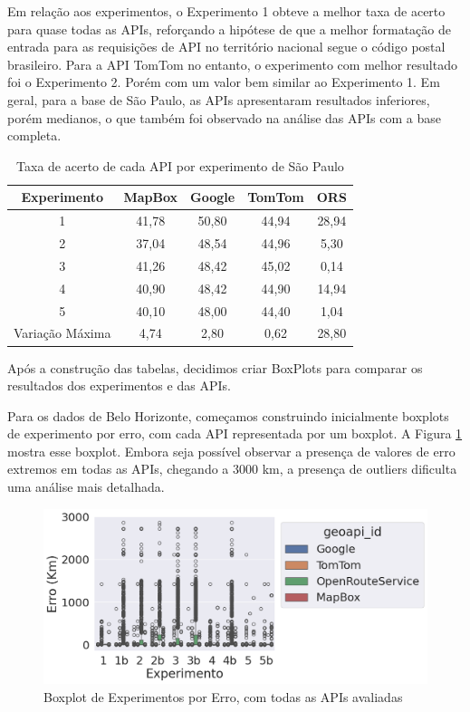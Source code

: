 Em relação aos experimentos, o Experimento 1 obteve a melhor taxa de acerto para quase todas as APIs, reforçando a hipótese de que a melhor formatação de entrada para as requisições de API no território nacional segue o código postal brasileiro. Para a API TomTom no entanto, o experimento com melhor resultado foi o Experimento 2. Porém com um valor bem similar ao Experimento 1. Em geral, para a base de São Paulo, as APIs apresentaram resultados inferiores, porém medianos, o que também foi observado na análise das APIs com a base completa.

\begin{table}[!ht]
  \centering
  \caption{Taxa de acerto de cada API por experimento de São Paulo}
  \label{tab:txAcerExpAPISP}
  \begin{adjustbox}{width=0.7\textwidth}
  \begin{tabular}{|c|c|c|c|c|}
  \hline
  Experimento & MapBox & Google & TomTom & ORS\\
  \hline
  1 & 41,78 & 50,80 & 44,94 & 28,94\\
  \hline
  2 & 37,04 & 48,54 & 44,96 & 5,30\\
  \hline
  3 & 41,26 & 48,42 & 45,02 & 0,14\\
  \hline
  4 & 40,90 & 48,42 & 44,90 & 14,94\\
  \hline
  5 & 40,10 & 48,00 & 44,40 & 1,04\\
  \hline
  Variação Máxima & 4,74 & 2,80 & 0,62 & 28,80\\
  \hline
  \end{tabular}
  \end{adjustbox}
\end{table}

Após a construção das tabelas, decidimos criar BoxPlots para comparar os resultados dos experimentos e das APIs.

Para os dados de Belo Horizonte, começamos construindo inicialmente boxplots de experimento por erro, com cada API representada por um boxplot. A Figura \ref{fig:boxplot-completo-bh} mostra esse boxplot. Embora seja possível observar a presença de valores de erro extremos em todas as APIs, chegando a 3000 km, a presença de outliers dificulta uma análise mais detalhada.

\begin{figure}[h]
    \centering
    \includegraphics[width=\textwidth]{Figuras/boxplotExperimento.png}
    \caption{Boxplot de Experimentos por Erro, com todas as APIs avaliadas}
    \label{fig:boxplot-completo-bh}
\end{figure}

